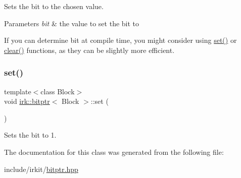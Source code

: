 Sets the bit to the chosen value. 


\begin{DoxyParams}{Parameters}
{\em bit} & the value to set the bit to\\
\hline
\end{DoxyParams}
If you can determine {\ttfamily bit} at compile time, you might consider using {\ttfamily \mbox{\hyperlink{classirk_1_1bitptr_a11089c343ac361d3ca5d86f8109c2d42}{set()}}} or {\ttfamily \mbox{\hyperlink{classirk_1_1bitptr_acb0f89f9751fc114558234b79d49aac6}{clear()}}} functions, as they can be slightly more efficient. \mbox{\label{classirk_1_1bitptr_a11089c343ac361d3ca5d86f8109c2d42}} 
\subsubsection{\texorpdfstring{set()}{set()}\hspace{0.1cm}{\footnotesize\ttfamily [2/2]}}
{\footnotesize\ttfamily template$<$class Block$>$ \\
void \mbox{\hyperlink{classirk_1_1bitptr}{irk\+::bitptr}}$<$ Block $>$\+::set (\begin{DoxyParamCaption}{ }\end{DoxyParamCaption})\hspace{0.3cm}{\ttfamily [inline]}}



Sets the bit to 1. 



The documentation for this class was generated from the following file\+:\begin{DoxyCompactItemize}
\item 
include/irkit/\mbox{\hyperlink{bitptr_8hpp}{bitptr.\+hpp}}\end{DoxyCompactItemize}
